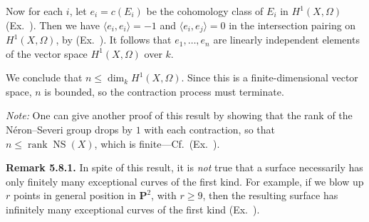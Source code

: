 {Now for each $i$, let $e_i=c(E_i)$ be the cohomology class of $E_i$ in $H^1(X,\Omega)$ (Ex.~). Then we have $\langle e_i,e_i\rangle=-1$ and $\langle e_i,e_j\rangle=0$ in the intersection pairing on $H^1(X,\Omega)$, by (Ex.~). It follows that $e_1,\dots,e_n$ are linearly independent elements of the vector space $H^1(X,\Omega)$ over $k$.

We conclude that $n\le\dim_kH^1(X,\Omega)$. Since this is a finite-dimensional vector space, $n$ is bounded, so the contraction process must terminate.

\emph{Note:} One can give another proof of this result by showing that the rank of the N\'eron--Severi group drops by $1$ with each contraction, so that $n\le\operatorname{rank}\operatorname{NS}(X)$, which is finite---Cf.\ (Ex.~).

\medskip
\noindent\hypertarget{result-V-5.8.1}{}\textbf{Remark 5.8.1.} In spite of this result, it is \emph{not} true that a surface necessarily has only finitely many exceptional curves of the first kind. For example, if we blow up $r$ points in general position in $\mathbf P^2$, with $r\ge9$, then the resulting surface has infinitely many exceptional curves of the first kind (Ex.~).}
